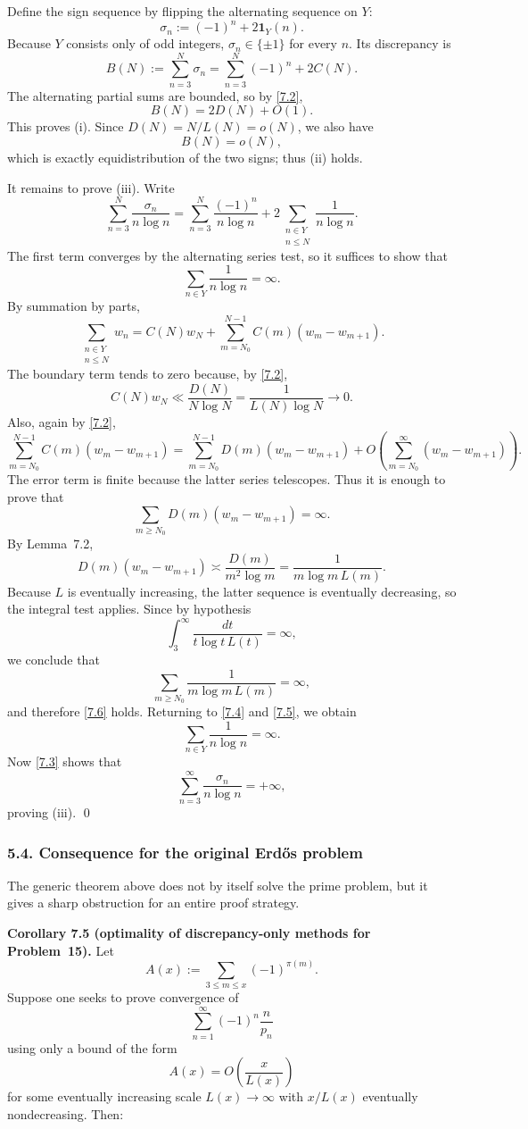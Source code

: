 Define the sign sequence by flipping the alternating sequence on $Y$:
\[
\sigma_n:=(-1)^n + 2\mathbf 1_Y(n).
\]
Because $Y$ consists only of odd integers, $\sigma_n\in\{\pm1\}$ for every $n$.
Its discrepancy is
\[
B(N):=\sum_{n=3}^N \sigma_n
=
\sum_{n=3}^N (-1)^n + 2C(N).
\]
The alternating partial sums are bounded, so by \eqref{7.2},
\[
B(N)=2D(N)+O(1).
\]
This proves (i). Since $D(N)=N/L(N)=o(N)$, we also have
\[
B(N)=o(N),
\]
which is exactly equidistribution of the two signs; thus (ii) holds.

It remains to prove (iii). Write
\[
\sum_{n=3}^N \frac{\sigma_n}{n\log n}
=
\sum_{n=3}^N \frac{(-1)^n}{n\log n}
+
2\sum_{\substack{n\in Y\\ n\le N}} \frac{1}{n\log n}.
\tag{7.3}
\]
The first term converges by the alternating series test, so it suffices to show that
\[
\sum_{n\in Y} \frac{1}{n\log n}=\infty.
\]
By summation by parts,
\[
\sum_{\substack{n\in Y\\ n\le N}} w_n
=
C(N)w_N + \sum_{m=N_0}^{N-1} C(m)(w_m-w_{m+1}).
\tag{7.4}
\]
The boundary term tends to zero because, by \eqref{7.2},
\[
C(N)w_N
\ll
\frac{D(N)}{N\log N}
=
\frac{1}{L(N)\log N}
\to 0.
\]
Also, again by \eqref{7.2},
\[
\sum_{m=N_0}^{N-1} C(m)(w_m-w_{m+1})
=
\sum_{m=N_0}^{N-1} D(m)(w_m-w_{m+1}) + O\!\left(\sum_{m=N_0}^{\infty}(w_m-w_{m+1})\right).
\tag{7.5}
\]
The error term is finite because the latter series telescopes.
Thus it is enough to prove that
\[
\sum_{m\ge N_0} D(m)(w_m-w_{m+1})=\infty.
\tag{7.6}
\]
By Lemma~7.2,
\[
D(m)(w_m-w_{m+1}) \asymp \frac{D(m)}{m^2\log m}
=
\frac{1}{m\log m\,L(m)}.
\]
Because $L$ is eventually increasing, the latter sequence is eventually decreasing, so the integral test applies. Since by hypothesis
\[
\int_3^\infty \frac{dt}{t\log t\,L(t)}=\infty,
\]
we conclude that
\[
\sum_{m\ge N_0} \frac{1}{m\log m\,L(m)}=\infty,
\]
and therefore \eqref{7.6} holds. Returning to \eqref{7.4} and \eqref{7.5}, we obtain
\[
\sum_{n\in Y} \frac{1}{n\log n}=\infty.
\]
Now \eqref{7.3} shows that
\[
\sum_{n=3}^\infty \frac{\sigma_n}{n\log n}=+\infty,
\]
proving (iii). \qed

\subsubsection*{5.4. Consequence for the original Erd\H{o}s problem}

The generic theorem above does not by itself solve the prime problem, but it gives a sharp obstruction for an entire proof strategy.

\textbf{Corollary 7.5 (optimality of discrepancy-only methods for Problem~15).}
Let
\[
A(x):=\sum_{3\le m\le x} (-1)^{\pi(m)}.
\]
Suppose one seeks to prove convergence of
\[
\sum_{n=1}^\infty (-1)^n\frac{n}{p_n}
\]
using only a bound of the form
\[
A(x)=O\!\left(\frac{x}{L(x)}\right)
\]
for some eventually increasing scale $L(x)\to\infty$ with $x/L(x)$ eventually nondecreasing.
Then:

